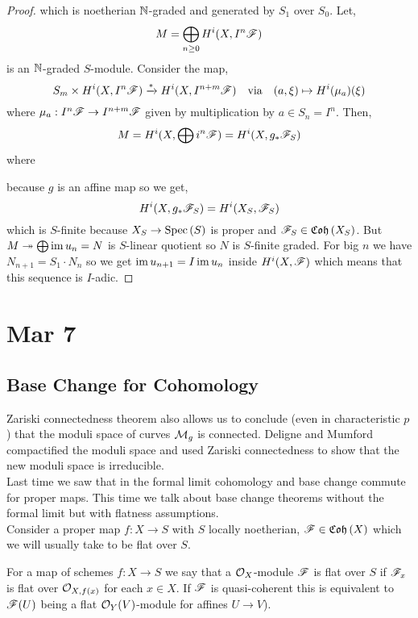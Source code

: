 \documentclass[12pt]{article}
\begin{document}
\begin{proof}
which is noetherian $\mathbb{N}$-graded and generated by $S_1$ over $S_0$. Let,
\[ M = \bigoplus_{n \ge 0} H^i(X, I^n \mathscr{F}) \]
is an $\mathbb{N}$-graded $S$-module. Consider the map,
\[ S_m \times H^i(X, I^n \mathscr{F}) \xrightarrow{*} H^i(X, I^{n+m} \mathscr{F}) \quad \text{via} \quad (a, \xi) \mapsto H^i(\mu_a)(\xi) \]
where $\mu_a : I^n \mathscr{F} \to I^{n+m} \mathscr{F}$ given by multiplication by $a \in S_n =  I^n$. Then,
\[ M = H^i(X, \bigoplus i^n \mathscr{F}) = H^i(X, g_* \mathscr{F}_S) \]
where
\begin{center}
\end{center}
because $g$ is an affine map so we get,
\[ H^i(X, g_* \mathscr{F}_S) = H^i(X_S, \mathscr{F}_S) \]
which is $S$-finite because $X_S \to \mathrm{Spec}\left( S \right)$ is proper and $\mathscr{F}_S \in \mathfrak{Coh}\left(X_S\right)$. But $M \twoheadrightarrow \bigoplus \operatorname{\mathrm{im}}{u_n} = N$ is $S$-linear quotient so $N$ is $S$-finite graded. For big $n$ we have $N_{n+1}  = S_1 \cdot N_n$ so we get $\operatorname{\mathrm{im}}{u_{n+1}} = I \operatorname{\mathrm{im}}{u_n}$ inside $H^i(X, \mathscr{F})$ which means that this sequence is $I$-adic. 
\end{proof}

\section{Mar 7}

\subsection{Base Change for Cohomology}

Zariski connectedness theorem also allows us to conclude (even in characteristic $p$) that the moduli space of curves $\mathcal{M}_g$ is connected. Deligne and Mumford compactified the moduli space and used Zariski connectedness to show that the new moduli space is irreducible. 
\bigskip\\
Last time we saw that in the formal limit cohomology and base change commute for proper maps. This time we talk about base change theorems without the formal limit but with flatness assumptions.
\bigskip\\
Consider a proper map $f : X \to S$ with $S$ locally noetherian, $\mathscr{F} \in \mathfrak{Coh}\left(X\right)$ which we will usually take to be flat over $S$.

\begin{defn}
For a map of schemes $f : X \to S$ we say that a $\mathcal{O}_{X}$-module $\mathscr{F}$ is flat over $S$ if $\mathscr{F}_x$ is flat over $\mathcal{O}_{X, f(x)}$ for each $x \in X$. If $\mathscr{F}$ is quasi-coherent this is equivalent to $\mathscr{F}(U)$ being a flat $\mathcal{O}_{Y}(V)$-module for affines $U \to V$). 
\end{defn}
\end{document}

